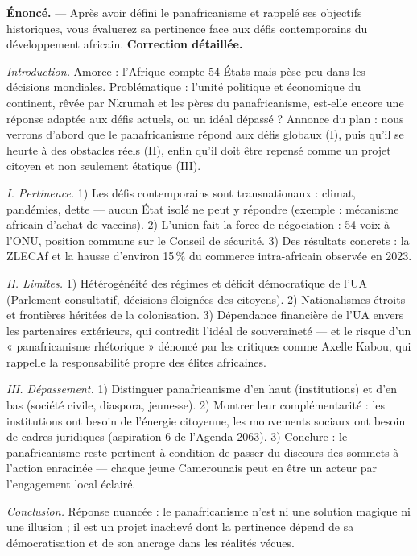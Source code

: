 \documentclass[11pt]{article}
\begin{document}
\begin{exoresolu}
\textbf{Énoncé.} — Après avoir défini le panafricanisme et rappelé ses objectifs historiques, vous évaluerez sa pertinence face aux défis contemporains du développement africain.
\tcblower
\textbf{Correction détaillée.}

\emph{Introduction.} Amorce : l'Afrique compte 54 États mais pèse peu dans les décisions mondiales. Problématique : l'unité politique et économique du continent, rêvée par Nkrumah et les pères du panafricanisme, est-elle encore une réponse adaptée aux défis actuels, ou un idéal dépassé ? Annonce du plan : nous verrons d'abord que le panafricanisme répond aux défis globaux (I), puis qu'il se heurte à des obstacles réels (II), enfin qu'il doit être repensé comme un projet citoyen et non seulement étatique (III).

\emph{I. Pertinence.} 1) Les défis contemporains sont transnationaux : climat, pandémies, dette — aucun État isolé ne peut y répondre (exemple : mécanisme africain d'achat de vaccins). 2) L'union fait la force de négociation : 54 voix à l'ONU, position commune sur le Conseil de sécurité. 3) Des résultats concrets : la ZLECAf et la hausse d'environ 15\,\% du commerce intra-africain observée en 2023.

\emph{II. Limites.} 1) Hétérogénéité des régimes et déficit démocratique de l'UA (Parlement consultatif, décisions éloignées des citoyens). 2) Nationalismes étroits et frontières héritées de la colonisation. 3) Dépendance financière de l'UA envers les partenaires extérieurs, qui contredit l'idéal de souveraineté — et le risque d'un « panafricanisme rhétorique » dénoncé par les critiques comme Axelle Kabou, qui rappelle la responsabilité propre des élites africaines.

\emph{III. Dépassement.} 1) Distinguer panafricanisme d'en haut (institutions) et d'en bas (société civile, diaspora, jeunesse). 2) Montrer leur complémentarité : les institutions ont besoin de l'énergie citoyenne, les mouvements sociaux ont besoin de cadres juridiques (aspiration 6 de l'Agenda 2063). 3) Conclure : le panafricanisme reste pertinent à condition de passer du discours des sommets à l'action enracinée — chaque jeune Camerounais peut en être un acteur par l'engagement local éclairé.

\emph{Conclusion.} Réponse nuancée : le panafricanisme n'est ni une solution magique ni une illusion ; il est un projet inachevé dont la pertinence dépend de sa démocratisation et de son ancrage dans les réalités vécues.
\end{exoresolu}
\end{document}
